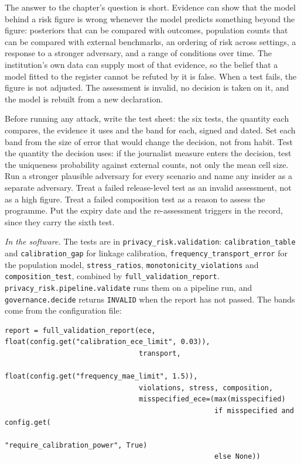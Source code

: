 The answer to the chapter's question is short. Evidence can show that the model
behind a risk figure is wrong whenever the model predicts something beyond the
figure: posteriors that can be compared with outcomes, population counts that can
be compared with external benchmarks, an ordering of risk across settings, a
response to a stronger adversary, and a range of conditions over time. The
institution's own data can supply most of that evidence, so the belief that a model
fitted to the register cannot be refuted by it is false. When a test fails, the
figure is not adjusted. The assessment is invalid, no decision is taken on it, and
the model is rebuilt from a new declaration.

\begin{inpractice}
\setlength{\emergencystretch}{3em}%
Before running any attack, write the test sheet: the six tests, the quantity each
compares, the evidence it uses and the band for each, signed and dated. Set each
band from the size of error that would change the decision, not from habit. Test
the quantity the decision uses: if the journalist measure enters the decision, test
the uniqueness probability against external counts, not only the mean cell size.
Run a stronger plausible adversary for every scenario and name any insider as a
separate adversary. Treat a failed release-level test as an invalid assessment, not
as a high figure. Treat a failed composition test as a reason to assess the
programme. Put the expiry date and the re-assessment triggers in the record, since
they carry the sixth test.

\smallskip\noindent\textit{In the software.} The tests are in
\texttt{privacy\_\allowbreak{}risk.\allowbreak{}validation}: \texttt{calibration\_\allowbreak{}table} and
\texttt{calibration\_\allowbreak{}gap} for linkage calibration,
\texttt{frequency\_\allowbreak{}transport\_\allowbreak{}error} for the population model,
\texttt{stress\_\allowbreak{}ratios}, \texttt{monotonicity\_\allowbreak{}violations} and
\texttt{composition\_\allowbreak{}test}, combined by \texttt{full\_\allowbreak{}validation\_\allowbreak{}report}.
\texttt{privacy\_\allowbreak{}risk.\allowbreak{}pipeline.\allowbreak{}validate} runs them on a pipeline run, and
\texttt{governance.\allowbreak{}decide} returns \texttt{INVALID} when the report has not passed.
The bands come from the configuration file:
\begin{lstlisting}
report = full_validation_report(ece, float(config.get("calibration_ece_limit", 0.03)),
                                transport,
                                float(config.get("frequency_mae_limit", 1.5)),
                                violations, stress, composition,
                                misspecified_ece=(max(misspecified)
                                                  if misspecified and config.get(
                                                      "require_calibration_power", True)
                                                  else None))
\end{lstlisting}
\end{inpractice}

